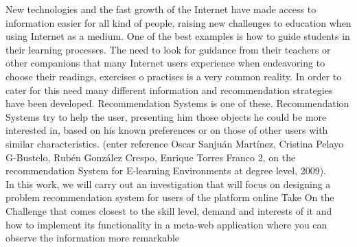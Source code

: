 New technologies and the fast growth of the Internet have made access to information easier for all kind of people, raising new challenges to education when using Internet as a medium. One of the best examples is how to guide students in their learning processes. The need to look for guidance from their teachers or other companions that many Internet users experience when endeavoring to choose their readings, exercises o practises is a very common reality. In order to cater for this need many different information and recommendation strategies have been developed. Recommendation Systems is one of these. Recommendation Systems try to help the user, presenting him those objects he could be more interested in, based on his known preferences or on those of other users with similar characteristics. (enter reference Oscar Sanjuán Martínez, Cristina Pelayo G-Bustelo, Rubén González Crespo, Enrique Torres Franco 2, on the recommendation System for E-learning Environments at degree level, 2009). \\

In this work, we will carry out an investigation that will focus on designing a problem recommendation system for users of the platform online Take On the Challenge that comes closest to the skill level, demand and interests of it and how to implement its functionality in a meta-web application where you can observe the information more remarkable









